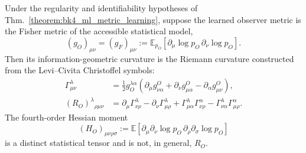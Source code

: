 \begin{corollary}\label{corollary:bk4_information_curvature}
Under the regularity and identifiability hypotheses of
Thm.~\ref{theorem:bk4_ml_metric_learning}, suppose the learned observer metric
is the Fisher metric of the accessible statistical model,
\begin{equation}
  (g_O)_{\mu\nu}= (g_F)_{\mu\nu}
  :=\mathbb{E}_{p_O}\!\left[
      \partial_\mu\log p_O\,\partial_\nu\log p_O
    \right].
\end{equation}
Then its information-geometric curvature is the Riemann curvature constructed
from the Levi--Civita Christoffel symbols:
\begin{align}
  \Gamma^{\lambda}_{\mu\nu}
  &=\frac12 g_O^{\lambda\alpha}
    \left(\partial_\mu g^O_{\nu\alpha}
         +\partial_\nu g^O_{\mu\alpha}
         -\partial_\alpha g^O_{\mu\nu}\right),\\
  (R_O)^{\lambda}{}_{\rho\mu\nu}
  &=\partial_\mu\Gamma^{\lambda}_{\nu\rho}
    -\partial_\nu\Gamma^{\lambda}_{\mu\rho}
    +\Gamma^{\lambda}_{\mu\alpha}\Gamma^{\alpha}_{\nu\rho}
    -\Gamma^{\lambda}_{\nu\alpha}\Gamma^{\alpha}_{\mu\rho}.
\end{align}
The fourth-order Hessian moment
\begin{equation}
  (H_O)_{\mu\nu\rho\sigma}
  :=\mathbb{E}\!\left[
    \partial_\mu\partial_\nu\log p_O\,
    \partial_\rho\partial_\sigma\log p_O
  \right]
\end{equation}
is a distinct statistical tensor and is not, in general, $R_O$.
\end{corollary}

